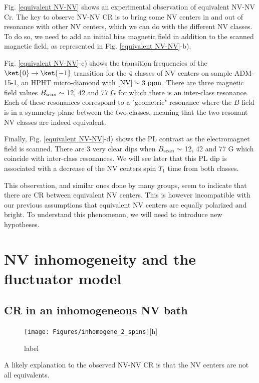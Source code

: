 \documentclass[a4paper,11pt]{report}
\begin{document}
Fig. \ref{equivalent NV-NV} shows an experimental observation of equivalent NV-NV Cr. The key to observe NV-NV CR is to bring some NV centers in and out of resonance with other NV centers, which we can do with the different NV classes. To do so, we need to add an initial bias magnetic field in addition to the scanned magnetic field, as represented in Fig. \ref{equivalent NV-NV}-b). %

Fig. \ref{equivalent NV-NV}-c) shows the transition frequencies of the $\ket{0}\to\ket{-1}$ transition for the 4 classes of NV centers on sample ADM-15-1, an HPHT micro-diamond with $[\rm NV]\sim 3\ \rm ppm$. There are three magnetic field values $B_{\rm scan} \sim$ 12, 42 and 77 G for which there is an inter-class resonance. Each of these resonances correspond to a "geometric" resonance where the $B$ field is in a symmetry plane between the two classes, meaning that the two resonant NV classes are indeed equivalent.

Finally, Fig. \ref{equivalent NV-NV}-d) shows the PL contrast as the electromagnet field is scanned. There are 3 very clear dips when $B_{\rm scan} \sim$ 12, 42 and 77 G which coincide with inter-class resonances. We will see later that this PL dip is associated with a decrease of the NV centers spin $T_1$ time from both classes.

This observation, and similar ones done by many groups, seem to indicate that there are CR between equivalent NV centers. This is however incompatible with our previous assumptions that equivalent NV centers are equally polarized and bright. To understand this phenomenon, we will need to introduce new hypotheses.

\section{NV inhomogeneity and the fluctuator model}

\subsection{CR in an inhomogeneous NV bath}
\begin{figure}[h]
\centering
\texttt{[image: Figures/inhomogene\_2\_spins]}[h]
\caption{label}
\label{inhomogene}
\end{figure}
A likely explanation to the observed NV-NV CR is that the NV centers are not all equivalents.
\end{document}
